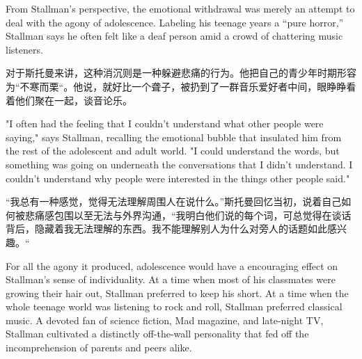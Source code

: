 \ifdefined\eng
From Stallman's perspective, the emotional withdrawal was merely an attempt to deal with the agony of adolescence. Labeling his teenage years a ``pure horror,'' Stallman says he often felt like a deaf person amid a crowd of chattering music listeners.
\fi

\ifdefined\chs
对于斯托曼来讲，这种消沉则是一种躲避悲痛的行为。他把自己的青少年时期形容为``不寒而栗``。他说，就好比一个聋子，被扔到了一群音乐爱好者中间，眼睁睁看着他们聚在一起，谈音论乐。
\fi

\ifdefined\eng
"I often had the feeling that I couldn't understand what other people were saying," says Stallman, recalling the emotional bubble that insulated him from the rest of the adolescent and adult world. "I could understand the words, but something was going on underneath the conversations that I didn't understand. I couldn't understand why people were interested in the things other people said."

\fi

\ifdefined\chs
``我总有一种感觉，觉得无法理解周围人在说什么。''斯托曼回忆当初，说着自己如何被悲痛感包围以至无法与外界沟通，``我明白他们说的每个词，可总觉得在谈话背后，隐藏着我无法理解的东西。我不能理解别人为什么对旁人的话题如此感兴趣。``
\fi

\ifdefined\eng
For all the agony it produced, adolescence would have a encouraging effect on Stallman's sense of individuality. At a time when most of his classmates were growing their hair out, Stallman preferred to keep his short. At a time when the whole teenage world was listening to rock and roll, Stallman preferred classical music. A devoted fan of science fiction, Mad magazine, and late-night TV, Stallman cultivated a distinctly off-the-wall personality that fed off the incomprehension of parents and peers alike.
\fi

